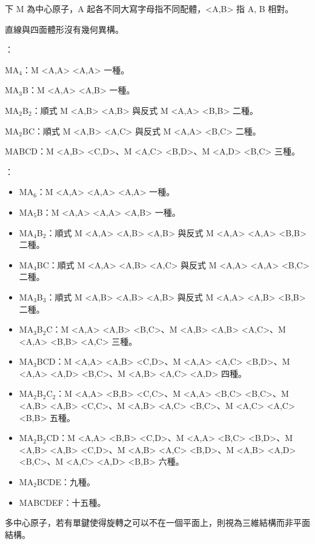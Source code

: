 \documentclass[a4paper,12pt]{report}
\begin{document}
下 M 為中心原子，A 起各不同大寫字母指不同配體，<A,B> 指 A, B 相對。

直線與四面體形沒有幾何異構。

：
\bit
\item MA$_4$：M <A,A> <A,A> 一種。
\item MA$_3$B：M <A,A> <A,B> 一種。
\item MA$_2$B$_2$：順式 M <A,B> <A,B> 與反式 M <A,A> <B,B> 二種。
\item MA$_2$BC：順式 M <A,B> <A,C> 與反式 M <A,A> <B,C> 二種。
\item MABCD：M <A,B> <C,D>、M <A,C> <B,D>、M <A,D> <B,C> 三種。
\eit

：
\begin{itemize}
\item MA$_6$：M <A,A> <A,A> <A,A> 一種。
\item MA$_5$B：M <A,A> <A,A> <A,B> 一種。
\item MA$_4$B$_2$：順式 M <A,A> <A,B> <A,B> 與反式 M <A,A> <A,A> <B,B> 二種。
\item MA$_4$BC：順式 M <A,A> <A,B> <A,C> 與反式 M <A,A> <A,A> <B,C> 二種。
\item MA$_3$B$_3$：順式 M <A,B> <A,B> <A,B> 與反式 M <A,A> <A,B> <B,B> 二種。
\item MA$_3$B$_2$C：M <A,A> <A,B> <B,C>、M <A,B> <A,B> <A,C>、M <A,A> <B,B> <A,C> 三種。
\item MA$_3$BCD：M <A,A> <A,B> <C,D>、M <A,A> <A,C> <B,D>、M <A,A> <A,D> <B,C>、M <A,B> <A,C> <A,D> 四種。
\item MA$_2$B$_2$C$_2$：M <A,A> <B,B> <C,C>、M <A,A> <B,C> <B,C>、M <A,B> <A,B> <C,C>、M <A,B> <A,C> <B,C>、M <A,C> <A,C> <B,B> 五種。
\item MA$_2$B$_2$CD：M <A,A> <B,B> <C,D>、M <A,A> <B,C> <B,D>、M <A,B> <A,B> <C,D>、M <A,B> <A,C> <B,D>、M <A,B> <A,D> <B,C>、M <A,C> <A,D> <B,B> 六種。
\item MA$_2$BCDE：九種。
\item MABCDEF：十五種。
\end{itemize}
多中心原子，若有單鍵使得旋轉之可以不在一個平面上，則視為三維結構而非平面結構。
\end{document}

